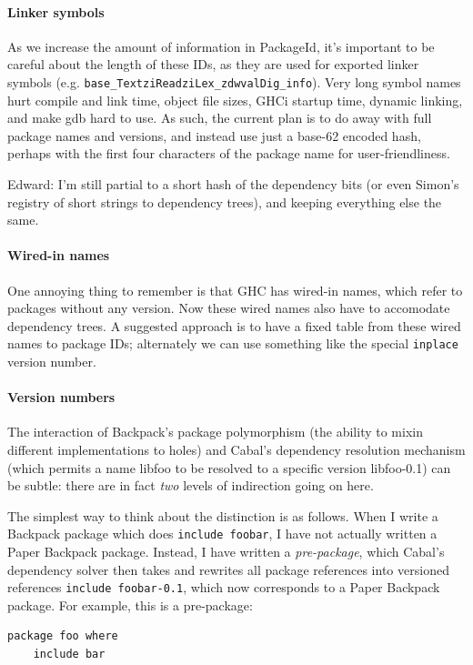 \documentclass{article}
\begin{document}
\paragraph{Linker symbols} As we increase the amount of information in
PackageId, it's important to be careful about the length of these IDs,
as they are used for exported linker symbols (e.g.
\verb|base_TextziReadziLex_zdwvalDig_info|).  Very long symbol names
hurt compile and link time, object file sizes, GHCi startup time,
dynamic linking, and make gdb hard to use.  As such, the current plan is
to do away with full package names and versions, and instead use just a
base-62 encoded hash, perhaps with the first four characters of the package
name for user-friendliness.

Edward: I'm still partial to a short hash of the dependency bits (or
even Simon's registry of short strings to dependency trees), and keeping
everything else the same.

\paragraph{Wired-in names} One annoying thing to remember is that GHC
has wired-in names, which refer to packages without any version.  Now
these wired names also have to accomodate dependency trees. A
suggested approach is to have a fixed table from these wired names to
package IDs; alternately we can use something like the special \verb|inplace|
version number.

\paragraph{Version numbers}  The interaction of Backpack's package polymorphism
(the ability to mixin different implementations to holes) and Cabal's dependency
resolution mechanism (which permits a name libfoo to be resolved to a specific
version libfoo-0.1) can be subtle: there are in fact \emph{two} levels of
indirection going on here.

The simplest way to think about the distinction is as follows.  When I write
a Backpack package which does \verb|include foobar|, I have not actually
written a Paper Backpack package.  Instead, I have written a \emph{pre-package},
which Cabal's dependency solver then takes and rewrites all package references
into versioned references \verb|include foobar-0.1|, which now corresponds to
a Paper Backpack package.  For example, this is a pre-package:

\begin{verbatim}
package foo where
    include bar
\end{verbatim}
\end{document}
